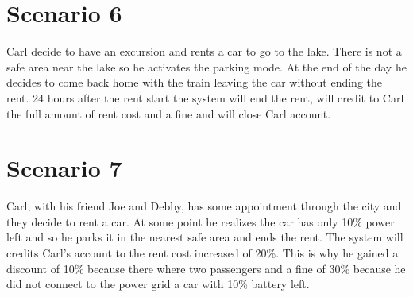 \section{Scenario 6}
Carl decide to have an excursion and rents a car to go to the lake. There is not a safe area near the lake so he activates the parking mode. At the end of the day he decides to come back home with the train leaving the car without ending the rent. 24 hours after the rent start the system will end the rent, will credit to Carl the full amount of rent cost and a fine and will close Carl account.
\section{Scenario 7}
Carl, with his friend Joe and Debby, has some appointment through the city and they decide to rent a car. At some point he realizes the car has only 10\% power left and so he parks it in the nearest safe area and ends the rent. The system will credits Carl's account to the rent cost increased of 20\%. This is why he gained a discount of 10\% because there where two passengers and a fine of 30\% because he did not connect to the power grid a car with 10\% battery left.
